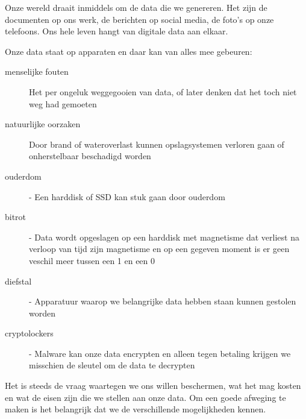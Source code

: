 Onze wereld draait inmiddels om de data die we genereren. Het zijn de documenten op ons werk, de berichten op social media, de foto's op onze telefoons. Ons hele leven hangt van digitale data aan elkaar.

Onze data staat op apparaten en daar kan van alles mee gebeuren:
\begin{description}
\item [menselijke fouten] Het per ongeluk weggegooien van data, of later denken dat het toch niet weg had gemoeten
\item [natuurlijke oorzaken] Door brand of wateroverlast kunnen opslagsystemen verloren gaan of onherstelbaar beschadigd worden
\item [ouderdom] - Een harddisk of SSD kan stuk gaan door ouderdom
\item [bitrot] - Data wordt opgeslagen op een harddisk met magnetisme dat verliest na verloop van tijd zijn magnetisme en op een gegeven moment is er geen veschil meer tussen een 1 en een 0
\item [diefstal] - Apparatuur waarop we belangrijke data hebben staan kunnen gestolen worden
\item [cryptolockers] - Malware kan onze data encrypten en alleen tegen betaling krijgen we misschien de sleutel om de data te decrypten
\end{description}

Het is steeds de vraag waartegen we ons willen beschermen, wat het mag kosten en wat de eisen zijn die we stellen aan onze data. Om een goede afweging te maken is het belangrijk dat we de verschillende mogelijkheden kennen.

